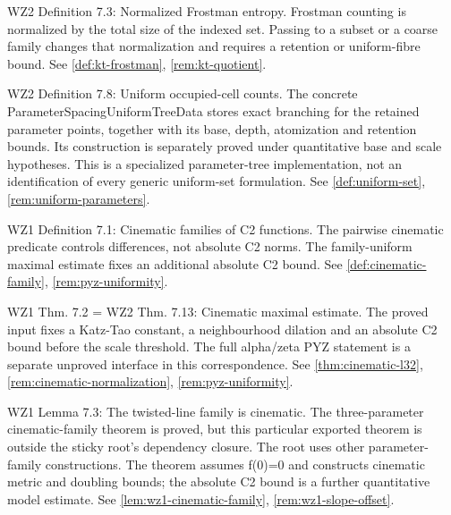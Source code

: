 \begin{remark}
\label{rem:atlas-W2DFrost}
WZ2 Definition 7.3: Normalized Frostman entropy.
Frostman counting is normalized by the total size of the indexed set. Passing to a subset or a coarse family changes that normalization and requires a retention or uniform-fibre bound.
See \ref{def:kt-frostman}, \ref{rem:kt-quotient}.
\end{remark}

\begin{remark}
\label{rem:atlas-W2DUnif}
WZ2 Definition 7.8: Uniform occupied-cell counts.
The concrete ParameterSpacingUniformTreeData stores exact branching for the retained parameter points, together with its base, depth, atomization and retention bounds. Its construction is separately proved under quantitative base and scale hypotheses. This is a specialized parameter-tree implementation, not an identification of every generic uniform-set formulation.
See \ref{def:uniform-set}, \ref{rem:uniform-parameters}.
\end{remark}

\begin{remark}
\label{rem:atlas-Dcinematic}
WZ1 Definition 7.1: Cinematic families of C2 functions.
The pairwise cinematic predicate controls differences, not absolute C2 norms. The family-uniform maximal estimate fixes an additional absolute C2 bound.
See \ref{def:cinematic-family}, \ref{rem:pyz-uniformity}.
\end{remark}

\begin{remark}
\label{rem:atlas-T7_2}
WZ1 Thm. 7.2 = WZ2 Thm. 7.13: Cinematic maximal estimate.
The proved input fixes a Katz-Tao constant, a neighbourhood dilation and an absolute C2 bound before the scale threshold. The full alpha/zeta PYZ statement is a separate unproved interface in this correspondence.
See \ref{thm:cinematic-l32}, \ref{rem:cinematic-normalization}, \ref{rem:pyz-uniformity}.
\end{remark}

\begin{remark}
\label{rem:atlas-L7_3}
WZ1 Lemma 7.3: The twisted-line family is cinematic.
The three-parameter cinematic-family theorem is proved, but this particular exported theorem is outside the sticky root's dependency closure. The root uses other parameter-family constructions. The theorem assumes f(0)=0 and constructs cinematic metric and doubling bounds; the absolute C2 bound is a further quantitative model estimate.
See \ref{lem:wz1-cinematic-family}, \ref{rem:wz1-slope-offset}.
\end{remark}

